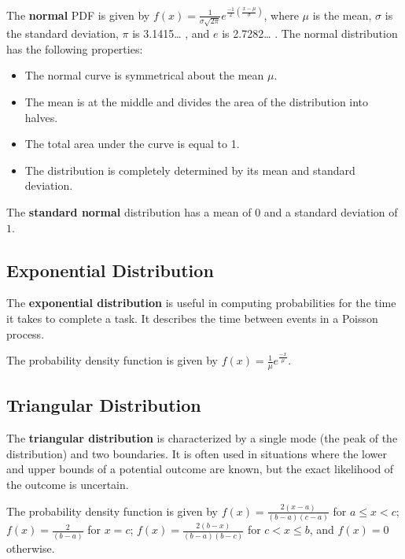 \documentclass[
  letterpaper,
  DIV=11,
  numbers=noendperiod]{scrreprt}
\begin{document}
The \textbf{normal} PDF is given by
\(f(x)= \frac {1}{\sigma \sqrt{2\pi}} e^{\frac {-1}{2} (\frac {x-\mu}{\sigma})}\),
where \(\mu\) is the mean, \(\sigma\) is the standard deviation, \(\pi\)
is 3.1415\ldots{} , and \(e\) is 2.7282\ldots{} . The normal
distribution has the following properties:

\begin{itemize}
\item
  The normal curve is symmetrical about the mean \(\mu\).
\item
  The mean is at the middle and divides the area of the distribution
  into halves.
\item
  The total area under the curve is equal to 1.
\item
  The distribution is completely determined by its mean and standard
  deviation.
\end{itemize}

The \textbf{standard normal} distribution has a mean of \(0\) and a
standard deviation of \(1\).

\hypertarget{exponential-distribution}{%
\subsection*{Exponential Distribution}\label{exponential-distribution}}

The \textbf{exponential distribution} is useful in computing
probabilities for the time it takes to complete a task. It describes the
time between events in a Poisson process.

The probability density function is given by
\(f(x)=\frac {1}{\mu}e^{ \frac {-x}{\mu}}\).

\hypertarget{triangular-distribution}{%
\subsection*{Triangular Distribution}\label{triangular-distribution}}

The \textbf{triangular distribution} is characterized by a single mode
(the peak of the distribution) and two boundaries. It is often used in
situations where the lower and upper bounds of a potential outcome are
known, but the exact likelihood of the outcome is uncertain.

The probability density function is given by
\(f(x)=\frac {2(x-a)}{(b-a)(c-a)}\) for \(a \leq x < c\);
\(f(x)=\frac {2}{(b-a)}\) for \(x=c\);
\(f(x)=\frac {2(b-x)}{(b-a)(b-c)}\) for \(c < x \leq b\), and \(f(x)=0\)
otherwise.
\end{document}
